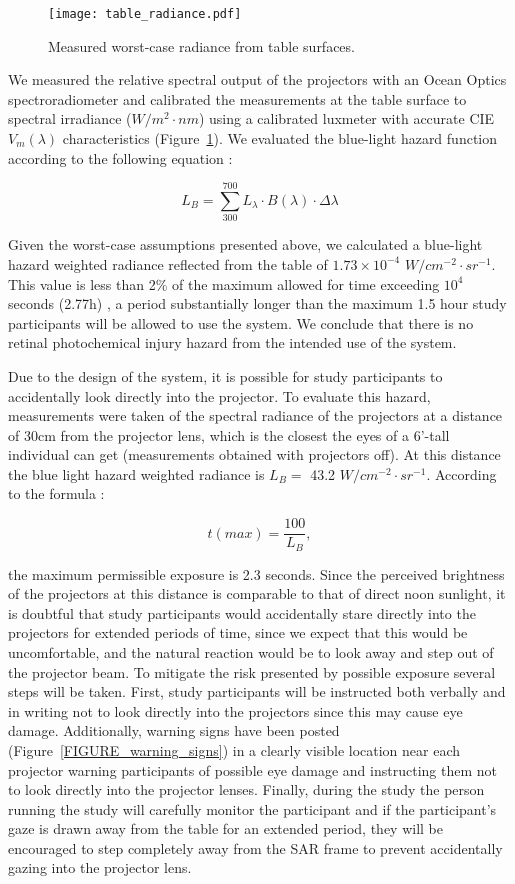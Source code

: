 \documentclass[10pt]{article}
\begin{document}
\begin{figure}[t]
  \begin{center}
    \texttt{[image: table\_radiance.pdf]}
  \end{center}
  \caption{Measured worst-case radiance from table surfaces.
\label{FIGURE_worst_case_radiance}
}
\end{figure}

We measured the relative spectral output of the projectors with an
Ocean Optics spectroradiometer and calibrated the measurements at the
table surface to spectral irradiance ($W/m^2\cdot nm$) using a
calibrated luxmeter with accurate CIE $V_m(\lambda)$ characteristics
(Figure~\ref{FIGURE_worst_case_radiance}).  We evaluated the
blue-light hazard function according to the following equation
\cite{ANSI}:


\[L_B = \sum_{300}^{700}L_{\lambda}\cdot B(\lambda)\cdot \Delta \lambda\]

Given the worst-case assumptions presented above, we calculated a
blue-light hazard weighted radiance reflected from the table of
$1.73\times10^{-4}$ $W/cm^{-2}\cdot sr^{-1}$.  This value is less than
2\% of the maximum allowed for time exceeding $10^4$ seconds (2.77h)
\cite{ANSI}, a period substantially longer than the maximum 1.5 hour
study participants will be allowed to use the system.  We conclude
that there is no retinal photochemical injury hazard from the intended
use of the system.

Due to the design of the system, it is possible for study participants
to accidentally look directly into the projector.  To evaluate this
hazard, measurements were taken of the spectral radiance of the
projectors at a distance of 30cm from the projector lens, which is the
closest the eyes of a 6'-tall individual can get (measurements
obtained with projectors off). At this distance the blue light hazard
weighted radiance is $L_B = $ 43.2 $W/cm^{-2}\cdot sr^{-1}$. According
to the formula \cite{ANSI}:

\[t(max) = \frac{100}{L_B},\]

\noindent
the maximum permissible exposure is 2.3 seconds.  Since the perceived
brightness of the projectors at this distance is comparable to that of
direct noon sunlight, it is doubtful that study participants would
accidentally stare directly into the projectors for extended periods
of time, since we expect that this would be uncomfortable, and the
natural reaction would be to look away and step out of the projector
beam.  To mitigate the risk presented by possible exposure several
steps will be taken.  First, study participants will be instructed
both verbally and in writing not to look directly into the projectors
since this may cause eye damage.  Additionally, warning signs have
been posted (Figure~\ref{FIGURE_warning_signs}) in a clearly visible
location near each projector warning participants of possible eye
damage and instructing them not to look directly into the projector
lenses.  Finally, during the study the person running the study will
carefully monitor the participant and if the participant's gaze is
drawn away from the table for an extended period, they will be
encouraged to step completely away from the SAR frame to prevent
accidentally gazing into the projector lens.
\end{document}
